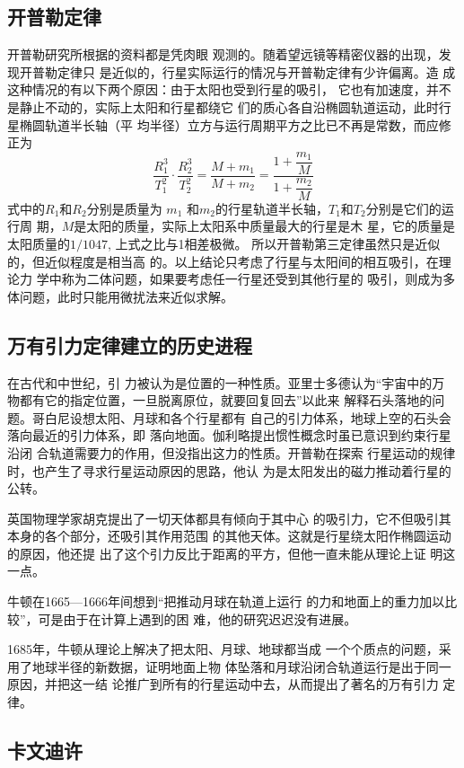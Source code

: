 \subsection{开普勒定律}
开普勒研究所根据的资料都是凭肉眼
观测的。随着望远镜等精密仪器的出现，发现开普勒定律只
是近似的，行星实际运行的情况与开普勒定律有少许偏离。造
成这种情况的有以下两个原因：由于太阳也受到行星的吸引，
它也有加速度，并不是静止不动的，实际上太阳和行星都绕它
们的质心各自沿椭圆轨道运动，此时行星椭圆轨道半长轴（平
均半径）立方与运行周期平方之比已不再是常数，而应修正为
\[\frac{R_1^3}{T^2_1}\cdot \frac{R^3_2}{T^2_2}=\frac{M+m_1}{M+m_2}=\frac{1+\dfrac{m_1}{M}}{1+\dfrac{m_2}{M}}\]
式中的$R_1$和$R_2$分别是质量为
$m_1$
和$m_2$的行星轨道半长轴，$T_1$和$T_2$分别是它们的运行周
期，$M$是太阳的质量，实际上太阳系中质量最大的行星是木
星，它的质量是太阳质量的$1/1047$, 上式之比与1相差极微。
所以开普勒第三定律虽然只是近似的，但近似程度是相当高
的。以上结论只考虑了行星与太阳间的相互吸引，在理论力
学中称为二体问题，如果要考虑任一行星还受到其他行星的
吸引，则成为多体问题，此时只能用微扰法来近似求解。

\subsection{万有引力定律建立的历史进程}

在古代和中世纪，引
力被认为是位置的一种性质。亚里士多德认为“宇宙中的万
物都有它的指定位置，一旦脱离原位，就要回复回去”以此来
解释石头落地的问题。哥白尼设想太阳、月球和各个行星都有
自己的引力体系，地球上空的石头会落向最近的引力体系，即
落向地面。伽利略提出惯性概念时虽已意识到约束行星沿闭
合轨道需要力的作用，但没指出这力的性质。开普勒在探索
行星运动的规律时，也产生了寻求行星运动原因的思路，他认
为是太阳发出的磁力推动着行星的公转。

英国物理学家胡克提出了一切天体都具有倾向于其中心
的吸引力，它不但吸引其本身的各个部分，还吸引其作用范围
的其他天体。这就是行星绕太阳作椭圆运动的原因，他还提
出了这个引力反比于距离的平方，但他一直未能从理论上证
明这一点。

牛顿在1665—1666年间想到“把推动月球在轨道上运行
的力和地面上的重力加以比较”，可是由于在计算上遇到的困
难，他的研究迟迟没有进展。

1685年，牛顿从理论上解决了把太阳、月球、地球都当成
一个个质点的问题，采用了地球半径的新数据，证明地面上物
体坠落和月球沿闭合轨道运行是出于同一原因，并把这一结
论推广到所有的行星运动中去，从而提出了著名的万有引力
定律。

\subsection{卡文迪许}

